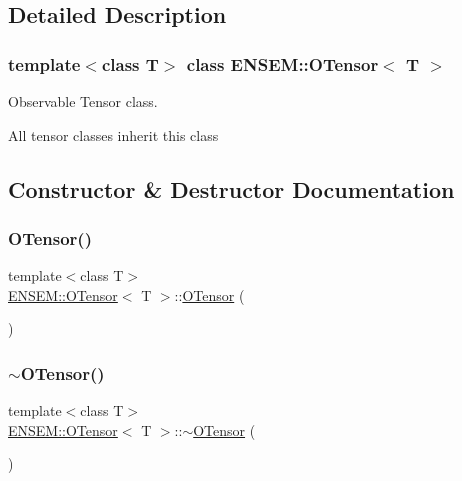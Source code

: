 \subsection{Detailed Description}
\subsubsection*{template$<$class T$>$\newline
class E\+N\+S\+E\+M\+::\+O\+Tensor$<$ T $>$}

Observable Tensor class. 

All tensor classes inherit this class 

\subsection{Constructor \& Destructor Documentation}
\mbox{\label{classENSEM_1_1OTensor_a514d20086c92e7b19386708978d34483}} 
\subsubsection{\texorpdfstring{OTensor()}{OTensor()}\hspace{0.1cm}{\footnotesize\ttfamily [1/6]}}
{\footnotesize\ttfamily template$<$class T$>$ \\
\mbox{\hyperlink{classENSEM_1_1OTensor}{E\+N\+S\+E\+M\+::\+O\+Tensor}}$<$ T $>$\+::\mbox{\hyperlink{classENSEM_1_1OTensor}{O\+Tensor}} (\begin{DoxyParamCaption}{ }\end{DoxyParamCaption})\hspace{0.3cm}{\ttfamily [inline]}}

\mbox{\label{classENSEM_1_1OTensor_a7be6a7cdba7403be29ede1f21ee706f7}} 
\subsubsection{\texorpdfstring{$\sim$OTensor()}{~OTensor()}\hspace{0.1cm}{\footnotesize\ttfamily [1/2]}}
{\footnotesize\ttfamily template$<$class T$>$ \\
\mbox{\hyperlink{classENSEM_1_1OTensor}{E\+N\+S\+E\+M\+::\+O\+Tensor}}$<$ T $>$\+::$\sim$\mbox{\hyperlink{classENSEM_1_1OTensor}{O\+Tensor}} (\begin{DoxyParamCaption}{ }\end{DoxyParamCaption})\hspace{0.3cm}{\ttfamily [inline]}}


